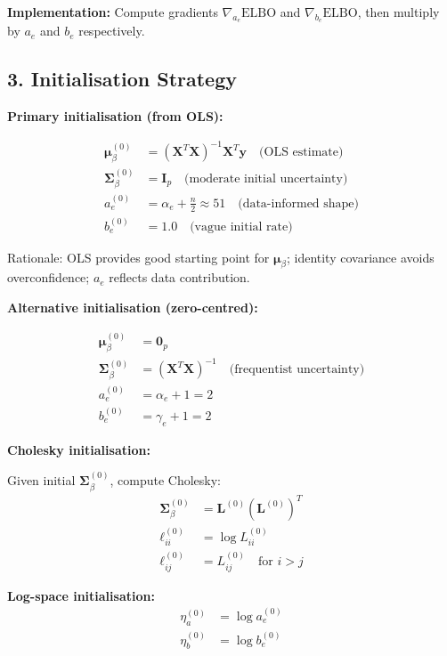 \documentclass[11pt,a4paper]{article}
\newcommand{\ELBO}{\text{ELBO}}
\begin{document}
\textbf{Implementation:} Compute gradients $\nabla_{a_e} \ELBO$ and $\nabla_{b_e} \ELBO$, then multiply by $a_e$ and $b_e$ respectively.

\subsection*{3. Initialisation Strategy}

\textbf{Primary initialisation (from OLS):}

\begin{align}
\bm{\mu}_\beta^{(0)} &= (\bm{X}^T \bm{X})^{-1} \bm{X}^T \bm{y} \quad \text{(OLS estimate)}\\
\bm{\Sigma}_\beta^{(0)} &= \bm{I}_p \quad \text{(moderate initial uncertainty)}\\
a_e^{(0)} &= \alpha_e + \frac{n}{2} \approx 51 \quad \text{(data-informed shape)}\\
b_e^{(0)} &= 1.0 \quad \text{(vague initial rate)}
\end{align}

Rationale: OLS provides good starting point for $\bm{\mu}_\beta$; identity covariance avoids overconfidence; $a_e$ reflects data contribution.

\textbf{Alternative initialisation (zero-centred):}

\begin{align}
\bm{\mu}_\beta^{(0)} &= \bm{0}_p\\
\bm{\Sigma}_\beta^{(0)} &= (\bm{X}^T \bm{X})^{-1} \quad \text{(frequentist uncertainty)}\\
a_e^{(0)} &= \alpha_e + 1 = 2\\
b_e^{(0)} &= \gamma_e + 1 = 2
\end{align}

\textbf{Cholesky initialisation:}

Given initial $\bm{\Sigma}_\beta^{(0)}$, compute Cholesky:
\begin{align}
\bm{\Sigma}_\beta^{(0)} &= \bm{L}^{(0)} (\bm{L}^{(0)})^T\\
\ell_{ii}^{(0)} &= \log L_{ii}^{(0)}\\
\ell_{ij}^{(0)} &= L_{ij}^{(0)} \quad \text{for } i > j
\end{align}

\textbf{Log-space initialisation:}
\begin{align}
\eta_a^{(0)} &= \log a_e^{(0)}\\
\eta_b^{(0)} &= \log b_e^{(0)}
\end{align}
\end{document}
